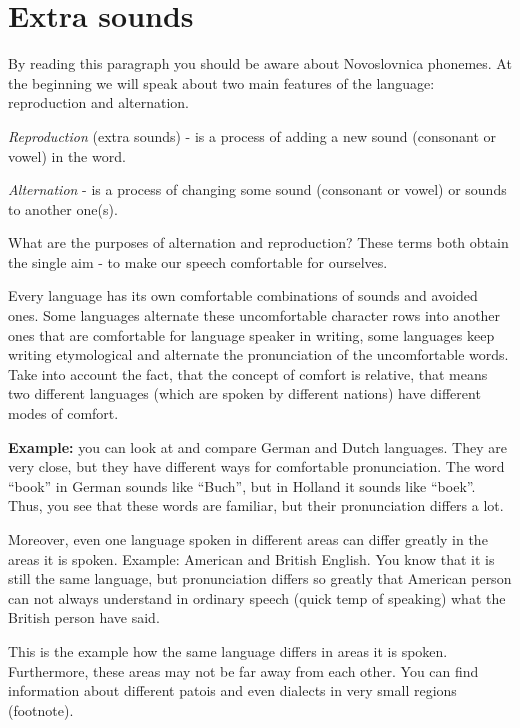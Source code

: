 \section{Extra sounds}

By reading this paragraph you should be aware about Novoslovnica phonemes. At the beginning we will speak about two main features of the language: reproduction and alternation.

\textit{Reproduction} (extra sounds) - is a process of adding a new sound (consonant or vowel) in the word.

\textit{Alternation} - is a process of changing some sound (consonant or vowel) or sounds to another one(s).

What are the purposes of alternation and reproduction? These terms both obtain the single aim - to make our speech comfortable for ourselves.

Every language has its own comfortable combinations of sounds and avoided ones. Some languages alternate these uncomfortable character rows into another ones that are comfortable for language speaker in writing, some languages keep writing etymological and alternate the pronunciation of the uncomfortable words. Take into account the fact, that the concept of comfort is relative, that means two different languages (which are spoken by different nations) have different modes of comfort.

\textbf{Example:} you can look at and compare German and Dutch languages. They are very close, but they have different ways for comfortable pronunciation. The word “book” in German sounds like “Buch”, but in Holland it sounds like “boek”. Thus, you see that these words are familiar, but their pronunciation differs a lot.

Moreover, even one language spoken in different areas can differ greatly in the areas it is spoken.
Example: American and British English. You know that it is still the same language, but pronunciation differs so greatly that American person can not always understand in ordinary speech (quick temp of speaking) what the British person have said.

This is the example how the same language differs in areas it is spoken. Furthermore, these areas may not be far away from each other. You can find information about different patois and even dialects in very small regions (footnote). 


